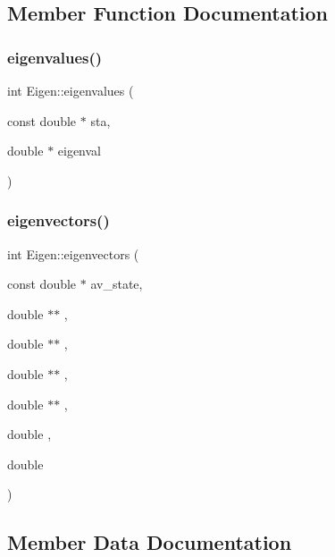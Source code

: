 \subsection{Member Function Documentation}
\mbox{\label{classEigen_a4a45e1dac3c8073ec21e3dcc8ca0443e}} 
\subsubsection{\texorpdfstring{eigenvalues()}{eigenvalues()}}
{\footnotesize\ttfamily int Eigen\+::eigenvalues (\begin{DoxyParamCaption}\item[{const double $\ast$}]{sta,  }\item[{double $\ast$}]{eigenval }\end{DoxyParamCaption})}

\mbox{\label{classEigen_a3b67128c27ba136235b089ec06a5f8d3}} 
\subsubsection{\texorpdfstring{eigenvectors()}{eigenvectors()}}
{\footnotesize\ttfamily int Eigen\+::eigenvectors (\begin{DoxyParamCaption}\item[{const double $\ast$}]{av\+\_\+state,  }\item[{double $\ast$$\ast$}]{,  }\item[{double $\ast$$\ast$}]{,  }\item[{double $\ast$$\ast$}]{,  }\item[{double $\ast$$\ast$}]{,  }\item[{double}]{,  }\item[{double}]{ }\end{DoxyParamCaption})}



\subsection{Member Data Documentation}
\mbox{\label{classEigen_a02c0c720bcf46cf277103513c7b10ba0}} 

